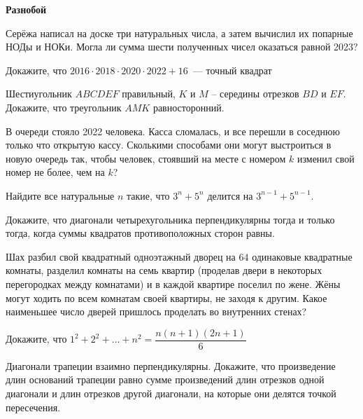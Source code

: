 \documentclass{article}
\begin{document}
    \large

    \begin{center}
        \textbf{Разнобой}
    \end{center}


    \begin{enumerate_boxed}

        \item Серёжа написал на доске три натуральных числа, а затем вычислил их попарные НОДы и НОКи.
        Могла ли сумма шести полученных чисел оказаться равной 2023?

        \item Докажите, что $2016 \cdot 2018 \cdot 2020 \cdot 2022+16$~--- точный квадрат

        \item Шестиугольник $ABCDEF$ правильный, $K$ и $M$ -- середины отрезков $BD$ и $EF$.
        Докажите, что треугольник $AMK$ равносторонний.

        \item В очереди стояло 2022 человека.
        Касса сломалась, и все перешли в соседнюю только что открытую кассу.
        Сколькими способами они могут выстроиться в новую очередь так, чтобы человек, стоявший на месте с номером $k$ изменил свой номер не более, чем на $k$?

        \item Найдите все натуральные $n$ такие, что $3^n + 5^n$ делится на $3^{n-1} + 5^{n-1}$.

        \item Докажите, что диагонали четырехугольника перпендикулярны тогда и только тогда, когда суммы квадратов противоположных сторон равны.

        \item Шах разбил свой квадратный одноэтажный дворец на $64$ одинаковые квадратные комнаты, разделил комнаты на семь квартир (проделав двери в некоторых перегородках между комнатами) и в каждой квартире поселил по жене.
        Жёны могут ходить по всем комнатам своей квартиры, не заходя к другим.
        Какое наименьшее число дверей пришлось проделать во внутренних стенах?

        \item Докажите, что $1^2 + 2^2 + \dots + n^2 =\dfrac{n (n+1)(2n + 1)}{6}$

        \item Диагонали трапеции взаимно перпендикулярны.
        Докажите, что произведение длин оснований трапеции равно сумме произведений длин отрезков одной диагонали и длин отрезков другой диагонали, на которые они делятся точкой пересечения.


\end{enumerate_boxed}
\end{document}
